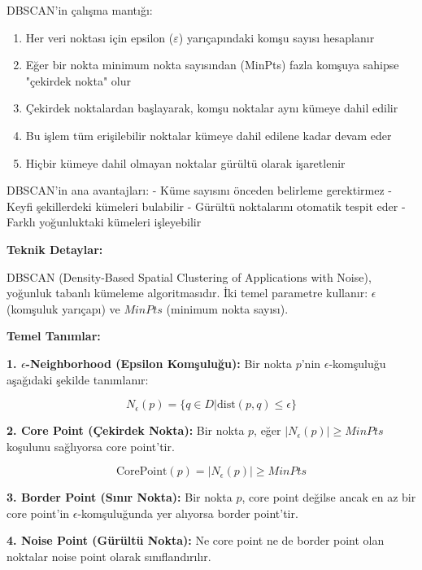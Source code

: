 DBSCAN'in çalışma mantığı:
\begin{enumerate}
    \item Her veri noktası için epsilon ($\varepsilon$) yarıçapındaki komşu sayısı hesaplanır
    \item Eğer bir nokta minimum nokta sayısından (MinPts) fazla komşuya sahipse "çekirdek nokta" olur
    \item Çekirdek noktalardan başlayarak, komşu noktalar aynı kümeye dahil edilir
    \item Bu işlem tüm erişilebilir noktalar kümeye dahil edilene kadar devam eder
    \item Hiçbir kümeye dahil olmayan noktalar gürültü olarak işaretlenir
\end{enumerate}

DBSCAN'in ana avantajları:
- Küme sayısını önceden belirleme gerektirmez
- Keyfi şekillerdeki kümeleri bulabilir
- Gürültü noktalarını otomatik tespit eder
- Farklı yoğunluktaki kümeleri işleyebilir

\textbf{Teknik Detaylar:}

DBSCAN (Density-Based Spatial Clustering of Applications with Noise), yoğunluk tabanlı kümeleme algoritmasıdır. İki temel parametre kullanır: $\epsilon$ (komşuluk yarıçapı) ve $MinPts$ (minimum nokta sayısı).

\newpage

\textbf{Temel Tanımlar:}

\textbf{1. $\epsilon$-Neighborhood (Epsilon Komşuluğu):}
Bir nokta $p$'nin $\epsilon$-komşuluğu aşağıdaki şekilde tanımlanır:

\begin{equation}
N_{\epsilon}(p) = \{q \in D | \text{dist}(p,q) \leq \epsilon\}
\label{eq:epsilon_neighborhood}
\end{equation}

\textbf{2. Core Point (Çekirdek Nokta):}
Bir nokta $p$, eğer $|N_{\epsilon}(p)| \geq MinPts$ koşulunu sağlıyorsa core point'tir.

\begin{equation}
\text{CorePoint}(p) = |N_{\epsilon}(p)| \geq MinPts
\label{eq:core_point}
\end{equation}

\textbf{3. Border Point (Sınır Nokta):}
Bir nokta $p$, core point değilse ancak en az bir core point'in $\epsilon$-komşuluğunda yer alıyorsa border point'tir.

\textbf{4. Noise Point (Gürültü Nokta):}
Ne core point ne de border point olan noktalar noise point olarak sınıflandırılır.

